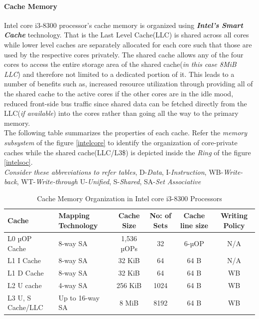 \documentclass[a4paper,11pt]{article}
\begin{document}
\paragraph{Cache Memory}
Intel core i3-8300 processor's cache memory is organized using \textbf{\textit{Intel's Smart Cache}} technology. That is the Last Level Cache(LLC) is shared across all cores while lower level caches are separately allocated for each core such that those are used by the respective cores privately. The shared cache allows any of the four cores to access the entire storage area of the shared cache(\textit{in this case 8MiB LLC}) and therefore not limited to a dedicated portion of it. This leads to a number of benefits such as, increased resource utilization through providing all of the shared cache to the active cores if the other cores are in the idle mood, reduced front-side bus traffic since shared data can be fetched directly from the LLC(\textit{if available}) into the cores  rather than going all the way to the primary memory\cite{smartcache}.\\

 The following table summarizes the properties of each cache. Refer the \textit{memory subsystem} of the figure \ref{intelcore} to identify the organization of core-private caches while the shared cache(LLC/L3\$) is depicted inside the \textit{Ring} of the figure \ref{intelsoc}.\\

{\footnotesize \textit{Consider these abbreviations to refer tables},
D-\textit{Data}, I-\textit{Instruction}, WB-\textit{Write-back}, WT-\textit{Write-through} U-\textit{Unified}, S-\textit{Shared}, SA-\textit{Set Associative}}

 \begin{table}[!h]
	\centering
	\begin{tabular}{l| l |c |c |c|c}
		Cache  & Mapping Technology &Cache Size & No: of Sets&Cache line size& Writing Policy\\
		\hline
		L0 µOP Cache&8-way SA&1,536 µOPs&32&6-µOP&	N/A\\
		L1 I Cache &8-way SA&32 KiB&64&64 B&N/A\\
		L1 D Cache&8-way SA&32 KiB&64&64 B&WB\\
		L2 U cache&4-way SA&256 KiB&1024&64 B&WB\\
		L3 U, S Cache/LLC&Up to 16-way SA&8 MiB&8192&64 B&WB\\
		\hline\hline
	\end{tabular}
	\caption{Cache Memory Organization in Intel core i3-8300 Processors\cite{Coffee}}
\end{table}
\end{document}
